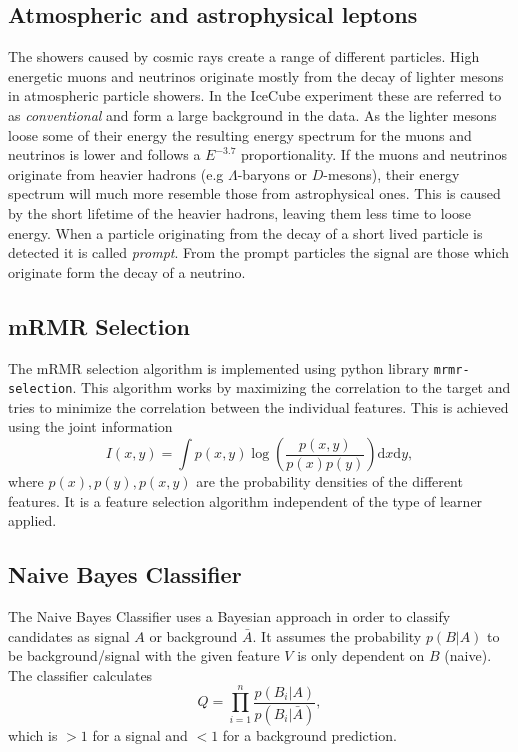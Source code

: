 \subsection{Atmospheric and astrophysical leptons}
The showers caused by cosmic rays create a range of different particles. 
High energetic muons and neutrinos originate mostly from the decay of lighter mesons in atmospheric particle showers. 
In the IceCube experiment these are referred to as \textit{conventional} and form a large background in the data.
As the lighter mesons loose some of their energy the resulting energy spectrum for the muons 
and neutrinos is lower and follows a $E^{-3.7}$ proportionality. 
If the muons and neutrinos originate from heavier hadrons 
(e.g $\Lambda$-baryons or $D$-mesons), their energy spectrum will much more resemble those from astrophysical ones. 
This is caused by the short lifetime of the heavier hadrons, leaving them less time to loose energy.
When a particle originating from the decay of a short lived particle is detected it is called \textit{prompt}. From the prompt particles the signal are those which originate form the decay of a neutrino.

\subsection{mRMR Selection}
\label{sec:mRmR}
The mRMR selection algorithm is implemented using python library \texttt{mrmr-selection}. This algorithm works by maximizing the correlation to the target and tries to minimize the correlation between the individual features. This is achieved using the joint information 
\begin{equation*}
	I(x,y) = \int p(x,y)\log\left(\frac{p(x,y)}{p(x)p(y)}\right)\mathrm{d}x\mathrm{d}y,
\end{equation*}
where $p(x),p(y),p(x,y)$ are the probability densities of the different features. It is a feature selection algorithm independent of the type of learner applied.

\subsection{Naive Bayes Classifier}
The Naive Bayes Classifier uses a Bayesian approach in order to classify candidates as signal $A$ or background $\bar{A}$. It assumes the probability $p(B|A)$ to be background/signal with the given feature $V$ is only dependent on $B$ (naive). The classifier calculates
\begin{equation*}
	Q = \prod_{i=1}^{n} \frac{p(B_i|A)}{p(B_i|\bar{A})},
\end{equation*}
which is $> 1$ for a signal and $< 1$ for a background prediction.

